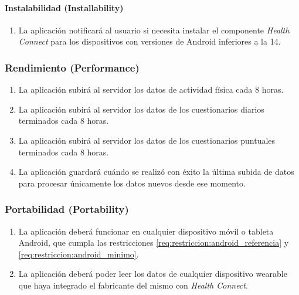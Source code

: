             \paragraph{Instalabilidad (Installability)}
                \begin{enumerate}[resume, label=\textbf{\texttt{RNF-\arabic*}}]
                    \item \label{req:no_funcionales:notificacion_salud_conectada} La aplicación notificará al usuario si necesita instalar el componente \textit{Health Connect} para los dispositivos con versiones de Android inferiores a la 14.
                \end{enumerate}
        \subsubsection{Rendimiento (Performance)}
            \begin{enumerate}[resume, label=\textbf{\texttt{RNF-\arabic*}}]
                \item \label{req:no_funcionales:frecuencia_subida_fisica} La aplicación subirá al servidor los datos de actividad física cada 8 horas.
                \item \label{req:no_funcionales:frecuencia_subida_diarios} La aplicación subirá al servidor los datos de los cuestionarios diarios terminados cada 8 horas.
                \item \label{req:no_funcionales:frecuencia_subida_puntuales} La aplicación subirá al servidor los datos de los cuestionarios puntuales terminados cada 8 horas.
                \item \label{req:no_funcionales:guardar_ultima_subida} La aplicación guardará cuándo se realizó con éxito la última subida de datos para procesar únicamente los datos nuevos desde ese momento.
            \end{enumerate}
        \subsubsection{Portabilidad (Portability)}
            \begin{enumerate}[resume, label=\textbf{\texttt{RNF-\arabic*}}]
                \item \label{req:no_funcionales:version_android} La aplicación deberá funcionar en cualquier dispositivo móvil o tableta Android, que cumpla las restricciones \ref{req:restriccion:android_referencia} y \ref{req:restriccion:android_minimo}.
                \item \label{req:no_funcionales:soporte_wearable} La aplicación deberá poder leer los datos de cualquier dispositivo \gls{wearable} que haya integrado el fabricante del mismo con \textit{Health Connect}.
            \end{enumerate}
